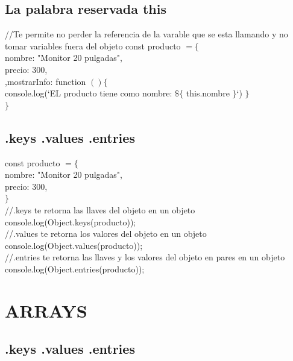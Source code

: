 \documentclass[10pt,a4paper]{article}
\begin{document}
\subsection{La palabra reservada this}
//Te permite no perder la referencia de la varable que se esta llamando y no tomar variables fuera del objeto
const producto  $ = \{ $  \\ nombre: "Monitor 20 pulgadas", \\ precio: 300, \\  ,mostrarInfo: function $ \left(  \right) \{$ \\
console.log(`EL producto tiene como nombre: $ \$ \{ $ this.nombre  $ \} $`) $ \} $ \\ $ \} $ \\ 
\newpage
\subsection{.keys .values .entries} 
const producto  $ = \{ $  \\ nombre: "Monitor 20 pulgadas", \\ precio: 300, \\  $ \} $ \\ 
//.keys te retorna las llaves del objeto en un objeto \\
console.log(Object.keys(producto)); \\
//.values te retorna los valores del objeto en un objeto \\
console.log(Object.values(producto)); \\
//.entries te retorna las llaves y los valores del objeto en pares en  un objeto \\
console.log(Object.entries(producto)); \\

\newpage
\section{ARRAYS}
\subsection{.keys .values .entries} 
\end{document}

